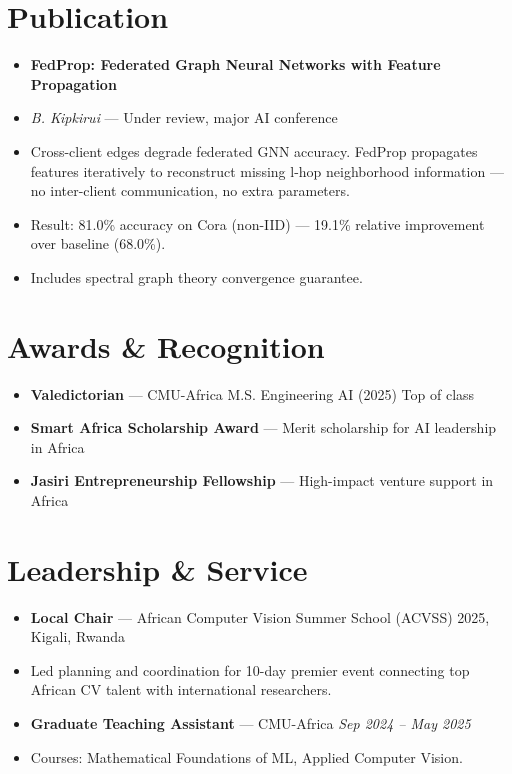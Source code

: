 \documentclass[11pt,letterpaper]{article}
\begin{document}
\section{Publication}
\begin{itemize}
    \item[] \textbf{FedProp: Federated Graph Neural Networks with Feature Propagation}
    \item[] \emph{B. Kipkirui} — Under review, major AI conference
    \item[] Cross-client edges degrade federated GNN accuracy. FedProp propagates features iteratively to reconstruct missing l-hop neighborhood information — no inter-client communication, no extra parameters.
    \item[] Result: 81.0\% accuracy on Cora (non-IID) — 19.1\% relative improvement over baseline (68.0\%).
    \item[] Includes spectral graph theory convergence guarantee.
\end{itemize}

\section{Awards \& Recognition}
\begin{itemize}
    \item[] \textbf{Valedictorian} — CMU-Africa M.S. Engineering AI (2025) \hfill Top of class
    \item[] \textbf{Smart Africa Scholarship Award} — Merit scholarship for AI leadership in Africa
    \item[] \textbf{Jasiri Entrepreneurship Fellowship} — High-impact venture support in Africa
\end{itemize}

\section{Leadership \& Service}
\begin{itemize}
    \item[] \textbf{Local Chair} — African Computer Vision Summer School (ACVSS) 2025, Kigali, Rwanda
    \item[] Led planning and coordination for 10-day premier event connecting top African CV talent with international researchers.
    \item[] \textbf{Graduate Teaching Assistant} — CMU-Africa \hfill \emph{Sep 2024 – May 2025}
    \item[] Courses: Mathematical Foundations of ML, Applied Computer Vision.
\end{itemize}
\end{document}
